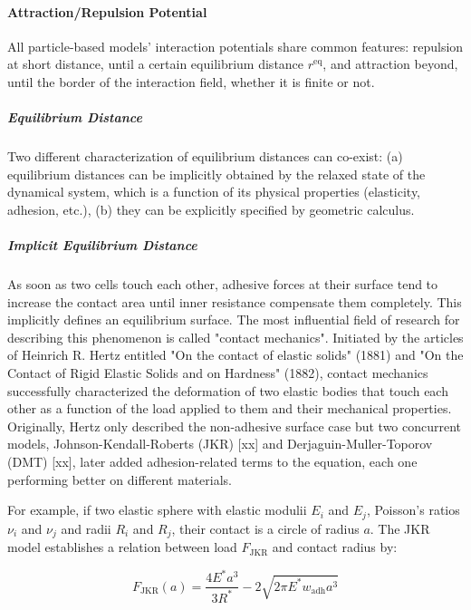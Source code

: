 \paragraph{Attraction/Repulsion Potential}


All particle-based models' interaction potentials share common features: repulsion at short distance, until a certain equilibrium distance $r^{\mathrm{eq}}$, and attraction beyond, until the border of the interaction field, whether it is finite or not.

\subparagraph{Equilibrium Distance}


Two different characterization of equilibrium distances can co-exist: (a) equilibrium distances can be implicitly obtained by the relaxed state of the dynamical system, which is a function of its physical properties (elasticity, adhesion, etc.), (b) they can be explicitly specified by geometric calculus.

\subparagraph{Implicit Equilibrium Distance}


As soon as two cells touch each other, adhesive forces at their surface tend to increase the contact area until inner resistance compensate them completely. This implicitly defines an equilibrium surface. The most influential field of research for describing this phenomenon is called "contact mechanics". Initiated by the articles of Heinrich R. Hertz entitled "On the contact of elastic solids" (1881) and "On the Contact of Rigid Elastic Solids and on Hardness" (1882), contact mechanics successfully characterized the deformation of two elastic bodies that touch each other as a function of the load applied to them and their mechanical properties. Originally, Hertz only described the non-adhesive surface case but two concurrent models, Johnson-Kendall-Roberts (JKR) [xx] and Derjaguin-Muller-Toporov (DMT) [xx], later added adhesion-related terms to the equation, each one performing better on different materials.

For example, if two elastic sphere with elastic modulii $E_i$ and $E_j$, Poisson's ratios $\nu_i$ and $\nu_j$ and radii $R_i$ and $R_j$, their contact is a circle of radius $a$. The JKR model establishes a relation between load $F_{\mathrm{JKR}}$ and contact radius by:

$$F_{\mathrm{JKR}} (a) = \frac{4 E^{*} a^3}{3 R^{*}} - 2 \sqrt{ 2 \pi E^{*} w_{\mathrm{adh}} a^3}$$

